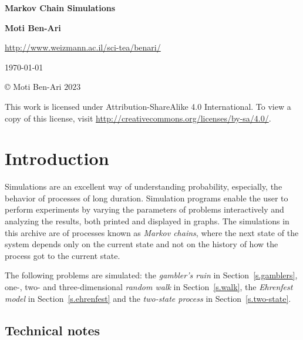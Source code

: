 
\thispagestyle{empty}

\begin{center}
\textbf{\LARGE Markov Chain Simulations}

\bigskip
\bigskip
\bigskip

\textbf{\Large Moti Ben-Ari}

\bigskip

\url{http://www.weizmann.ac.il/sci-tea/benari/}

\bigskip
\bigskip
\bigskip

\today

\end{center}

\vfill

\begin{center}
\copyright{} Moti Ben-Ari $2023$
 \end{center}
 
\begin{small}
This work is licensed under Attribution-ShareAlike 4.0 International. To view a copy of this license, visit \url{http://creativecommons.org/licenses/by-sa/4.0/}.
\end{small}
\newpage

\tableofcontents

\newpage

\section{Introduction}

Simulations are an excellent way of understanding probability, especially, the behavior of processes of long duration. Simulation programs enable the user to perform experiments by varying the parameters of problems interactively and analyzing the results, both printed and displayed in graphs. The simulations in this archive are of processes known as \emph{Markov chains}, where the next state of the system depends only on the current state and not on the history of how the process got to the current state. 

The following problems are simulated: the \emph{gambler's ruin} in 
Section~\ref{s.gamblers}, one-, two- and three-dimensional \emph{random walk} in Section~\ref{s.walk}, the \emph{Ehrenfest model} in Section~\ref{s.ehrenfest} and the \emph{two-state process} in Section~\ref{s.two-state}.

\subsection*{Technical notes}

